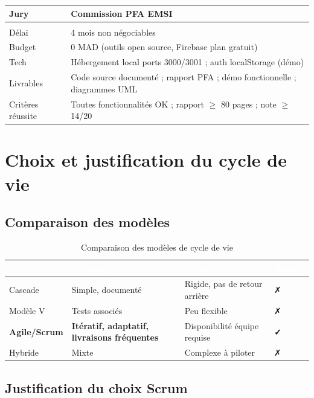 \begin{table}[H]
\begin{tabularx}{\textwidth}{|l|X|}
Jury & Commission PFA EMSI \\
\hline
\rowcolor{lightblue}\multicolumn{2}{|l|}{\textbf{Contraintes}} \\
\hline
Délai & 4 mois non négociables \\
Budget & 0 MAD (outils open source, Firebase plan gratuit) \\
Tech & Hébergement local ports 3000/3001 ; auth localStorage (démo) \\
\hline
Livrables & Code source documenté ; rapport PFA ; démo fonctionnelle ; diagrammes UML \\
Critères réussite & Toutes fonctionnalités OK ; rapport $\geq$ 80 pages ; note $\geq$ 14/20 \\
\hline
\end{tabularx}
\end{table}

\section{Choix et justification du cycle de vie}

\subsection{Comparaison des modèles}

\begin{table}[H]
\centering
\caption{Comparaison des modèles de cycle de vie}
\label{tab:cycle_vie}
\begin{tabularx}{\textwidth}{|l|X|X|l|}
\hline
\rowcolor{emsiblue}\textcolor{white}{\textbf{Modèle}} & \textcolor{white}{\textbf{Avantages}} & \textcolor{white}{\textbf{Inconvénients}} & \textcolor{white}{\textbf{Adapté}} \\
\hline
Cascade & Simple, documenté & Rigide, pas de retour arrière & ✗ \\
Modèle V & Tests associés & Peu flexible & ✗ \\
\textbf{Agile/Scrum} & \textbf{Itératif, adaptatif, livraisons fréquentes} & Disponibilité équipe requise & \textbf{✓} \\
Hybride & Mixte & Complexe à piloter & ✗ \\
\hline
\end{tabularx}
\end{table}

\subsection{Justification du choix Scrum}


